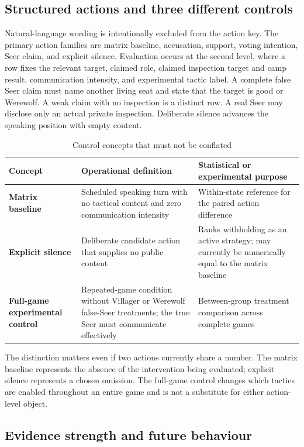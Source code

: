 \documentclass[11pt,a4paper]{article}
\begin{document}
\subsection{Structured actions and three different controls}

Natural-language wording is intentionally excluded from the action key. The primary action families are matrix baseline, accusation, support, voting intention, Seer claim, and explicit silence. Evaluation occurs at the second level, where a row fixes the relevant target, claimed role, claimed inspection target and camp result, communication intensity, and experimental tactic label. A complete false Seer claim must name another living seat and state that the target is good or Werewolf. A weak claim with no inspection is a distinct row. A real Seer may disclose only an actual private inspection. Deliberate silence advances the speaking position with empty content.

\begin{table}[htbp]
\centering
\caption{Control concepts that must not be conflated}
\begin{tabularx}{\textwidth}{>{\bfseries}p{}YY}
\toprule
Concept & Operational definition & Statistical or experimental purpose \\
\midrule
Matrix baseline & Scheduled speaking turn with no tactical content and zero communication intensity & Within-state reference for the paired action difference \\
Explicit silence & Deliberate candidate action that supplies no public content & Ranks withholding as an active strategy; may currently be numerically equal to the matrix baseline \\
Full-game experimental control & Repeated-game condition without Villager or Werewolf false-Seer treatments; the true Seer must communicate effectively & Between-group treatment comparison across complete games \\
\bottomrule
\end{tabularx}
\end{table}

The distinction matters even if two actions currently share a number. The matrix baseline represents the absence of the intervention being evaluated; explicit silence represents a chosen omission. The full-game control changes which tactics are enabled throughout an entire game and is not a substitute for either action-level object.

\subsection{Evidence strength and future behaviour}
\end{document}
